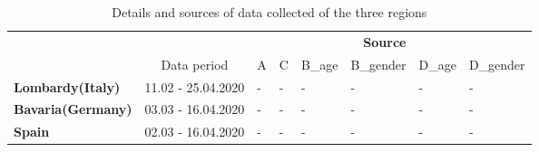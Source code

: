 \documentclass[../main.tex]{subfiles}
\begin{document}
\begin{table}[htbp]\centering
  \begin{tabular}{p{3.5cm}p{3.5cm}p{0.6cm}p{0.6cm}p{0.6cm}p{0.6cm}p{0.6cm}p{0.6cm}}
  \toprule
  & \multicolumn{5}{r}{\textbf{Source}} \\
  \cmidrule(r){3-8}
  & \multicolumn{1}{c}{Data period} & \multicolumn{1}{c}{A} & \multicolumn{1}{c}{C} & \multicolumn{1}{c}{B_{age}}& \multicolumn{1}{c}{B_{gender}}& \multicolumn{1}{c}{D_{age}}& \multicolumn{1}{c}{D_{gender}}\\
  \midrule
  \textbf{Lombardy(Italy)}  & 11.02 - 25.04.2020 & - & - & - & - & - & - \\
  \textbf{Bavaria(Germany)} & 03.03 - 16.04.2020 & - & - & - & - & - & - \\
  \textbf{Spain}            & 02.03 - 16.04.2020 & - & - & - & - & - & - \\
  \bottomrule
  \end{tabular}
\caption{Details and sources of data collected of the three regions}
\label{tab: three_regions}
\end{table}


\end{document}
